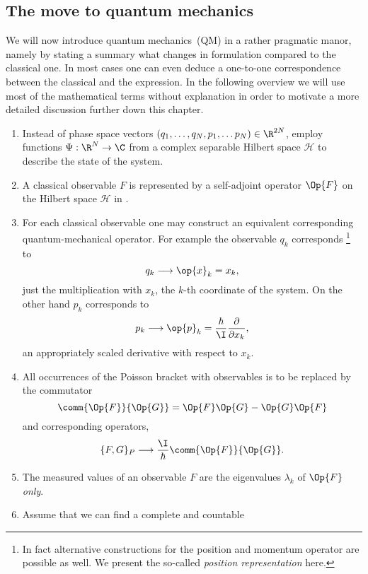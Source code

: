 \subsection{The move to quantum mechanics}
\label{sec:IntroQM}
\defineabbr{QM}{QM\xspace}{quantum mechanics}
We will now introduce quantum mechanics~(QM) in a rather pragmatic manor,
namely by stating a summary what changes in \QM formulation
compared to the classical one.
In most cases one can even deduce a one-to-one correspondence
between the classical and the \QM expression.
In the following overview we will use most of the mathematical terms without explanation
in order to motivate a more detailed discussion further down this chapter.

\begin{enumerate}
	\item Instead of phase space vectors $\clphase \in \R^{2N}$,
		employ functions $\Psi : \R^N \to \C$ from a
		complex separable Hilbert space $\mathcal{H}$
		to describe the state of the system.
	\item A classical observable $F$ is represented by a
		self-adjoint operator $\Op{F}$ on the Hilbert space $\mathcal{H}$ in \QM.
	\item For each classical observable one may construct an equivalent
		corresponding quantum-mechanical operator.
		For example the observable $q_k$ corresponds%
		\footnote{In fact alternative constructions for the position and momentum
				operator are possible as well. We present the so-called
				\textit{position representation} here.}
		to
		\[ q_k \longrightarrow \op{x}_k = x_k, \]
		\ie just the multiplication with $x_k$,
		the $k$-th coordinate of the system.
		On the other hand $p_k$ corresponds to
		\[ p_k \longrightarrow \op{p}_k
			= \frac{\hbar}{\I} \frac{\partial}{\partial x_k}, \]
		an appropriately scaled derivative with respect to $x_k$.
	\item All occurrences of the Poisson bracket with observables
		is to be replaced by the commutator
		\begin{equation}
			\comm{\Op{F}}{\Op{G}} = \Op{F} \Op{G} - \Op{G} \Op{F}
			\label{eqn:Operator}
		\end{equation}
		and corresponding operators, \ie
		\[ \{F, G\}_P \longrightarrow \frac{\I}{\hbar} \comm{\Op{F}}{\Op{G}}. \]
	\item The measured values of an observable $F$
		are the eigenvalues $\lambda_k$ of $\Op{F}$ \emph{only}.
	\item Assume that we can find a complete and countable

\end{enumerate}
